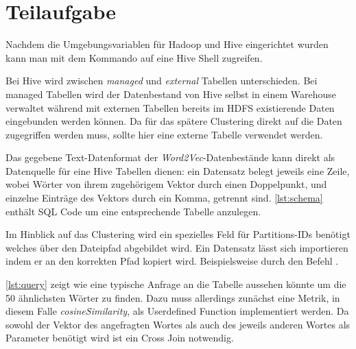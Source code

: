 \section{Teilaufgabe}

Nachdem die Umgebungsvariablen für Hadoop und Hive eingerichtet wurden kann man mit dem Kommando  auf eine Hive Shell zugreifen.

Bei Hive wird zwischen \emph{managed} und \emph{external} Tabellen unterschieden. Bei managed Tabellen wird der Datenbestand von Hive selbst in einem Warehouse verwaltet während mit externen Tabellen bereits im HDFS existierende Daten eingebunden werden können. Da für das spätere Clustering direkt auf die Daten zugegriffen werden muss, sollte hier eine externe Tabelle verwendet werden.

Das gegebene Text-Datenformat der \emph{Word2Vec}-Datenbestände kann direkt als Datenquelle für eine Hive Tabellen dienen: ein Datensatz belegt jeweils eine Zeile, wobei Wörter von ihrem zugehörigem Vektor durch einen Doppelpunkt, und einzelne Einträge des Vektors durch ein Komma, getrennt sind. \autoref{lst:schema} enthält SQL Code um eine entsprechende Tabelle anzulegen.



Im Hinblick auf das Clustering wird ein spezielles Feld für Partitions-IDs benötigt welches über den Dateipfad abgebildet wird. Ein Datensatz lässt sich importieren indem er an den korrekten Pfad kopiert wird. Beispielsweise durch den Befehl .



\autoref{lst:query} zeigt wie eine typische Anfrage an die Tabelle aussehen könnte um die 50 ähnlichsten Wörter zu finden. Dazu muss allerdings zunächst eine Metrik, in diesem Falle \emph{cosineSimilarity}, als Userdefined Function implementiert werden. Da sowohl der Vektor des angefragten Wortes als auch des jeweils anderen Wortes als Parameter benötigt wird ist ein Cross Join notwendig.